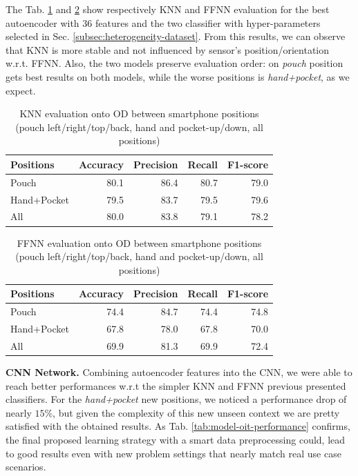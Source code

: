 The Tab. \ref{tab:knn-metrics} and \ref{tab:ffnn-metrics} show
respectively KNN and FFNN evaluation for the best autoencoder with
$36$ features and the two classifier with hyper-parameters selected in
Sec. \ref{subsec:heterogeneity-dataset}. From this results, we can
observe that KNN is more stable and not influenced by sensor's
position/orientation w.r.t. FFNN. Also, the two models preserve
evaluation order: on \textit{pouch} position gets best results on both
models, while the worse positions is \textit{hand+pocket}, as we
expect.

\begin{table}[h]
  \centering
  \begin{tabular}{lrrrr}
    \hline
    Positions & Accuracy & Precision & Recall & F1-score \\
    \hline
    Pouch & 80.1 & 86.4 & 80.7 & 79.0 \\
    Hand+Pocket & 79.5 & 83.7 & 79.5 & 79.6 \\
    All & 80.0 & 83.8 & 79.1 & 78.2 \\
    \hline
  \end{tabular}
  \caption{KNN evaluation onto OD between smartphone positions (pouch
    left/right/top/back, hand and pocket-up/down, all positions)}
  \label{tab:knn-metrics}
\end{table}

\begin{table}[h]
  \centering
  \begin{tabular}{lrrrr}
    \hline
    Positions & Accuracy & Precision & Recall & F1-score \\
    \hline
    Pouch & 74.4 & 84.7 & 74.4 & 74.8 \\
    Hand+Pocket & 67.8 & 78.0 & 67.8 & 70.0 \\
    All & 69.9 & 81.3 & 69.9 & 72.4 \\
    \hline
  \end{tabular}
  \caption{FFNN evaluation onto OD between smartphone positions (pouch
    left/right/top/back, hand and pocket-up/down, all positions)}
  \label{tab:ffnn-metrics}
\end{table}

\textbf{CNN Network.} Combining autoencoder features into the CNN, we were able to reach better performances w.r.t the simpler KNN and FFNN previous presented classifiers. For the \textit{hand+pocket} new positions, we noticed a performance drop of nearly $15\%$, but given the complexity of this new unseen context we are pretty satisfied with the obtained results. As
Tab. \ref{tab:model-oit-performance} confirms, the final proposed learning strategy with a smart data preprocessing could, lead to good results even with new problem
settings that nearly match real use case scenarios.

